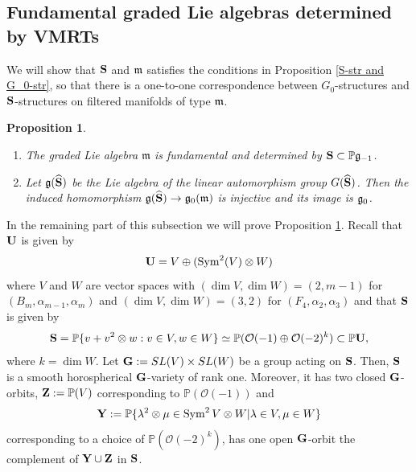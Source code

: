 \documentclass[12pt]{amsart}
\theoremstyle{plain}
\newtheorem{proposition}[theorem]{Proposition}
\theoremstyle{definition}
\def\Sym{\operatorname{Sym}}
\begin{document}
\subsection{Fundamental graded Lie algebras determined by VMRTs}    \label{sect: geometric structures modeled after X}

We will show that ${\bf S}$ and $\frak m$ satisfies the conditions in
Proposition \ref{S-str and G_0-str}, so that there is a one-to-one correspondence between $G_0$-structures and ${\bf S}$-structures on filtered manifolds of type $\frak m$.

\begin{proposition} \label{fundamental graded Lie algebra of vmrt}  $\,$
 \begin{enumerate}
\item The graded Lie algebra  $\mathfrak m $ is fundamental and determined by ${\bf S}  \subset \mathbb P \mathfrak g_{-1}$.
\item Let $\frak g(\widehat{\bf S})$ be the Lie algebra of the linear automorphism group   $G(\widehat{\bf S})$.
Then the induced homomorphism $\frak g(\widehat{\bf S}) \rightarrow \frak g_0(\frak m)$ is injective and its image is $\frak g_0$.
\end{enumerate}
 \end{proposition}

In the remaining part of this subsection we will prove Proposition \ref{fundamental graded Lie algebra of vmrt}. %
Recall that ${\bf U}$ is given by  $${\bf U} = V \oplus (\Sym^2(V) \otimes W)$$ where $V$ and $W$ are vector spaces with $(\dim V, \dim W)=(2, m-1)$ for $(B_m, \alpha_{m-1}, \alpha_{m})$ and $(\dim V, \dim W)=(3, 2)$ for $(F_4, \alpha_2, \alpha_3)$ and  that    ${{\bf S}}$ is given by
$${\bf S}=\mathbb P \{ v + v^2 \otimes w: v \in V, w \in W\}  \simeq \mathbb P (\mathcal O(-1) \oplus \mathcal O(-2)^{k}) \subset \mathbb P\bf U,$$ where $k=\dim W$.
Let ${\bf G}:=SL(V) \times SL(W)$ be a group acting on $\bf S$. Then, ${\bf S}$ is a smooth horospherical ${\bf G}$-variety of rank one. Moreover,  it has two closed ${\bf G}$-orbits, ${\bf Z}  :=\mathbb P(V)$ corresponding to $\mathbb P(\mathcal O(-1))$ and
\begin{eqnarray*}  {\bf Y}   := \mathbb P \{\lambda^2\otimes\mu \in \Sym^2V\otimes W | \lambda \in V ,
\mu \in W \}\end{eqnarray*}
corresponding to a choice of  $\mathbb P(\mathcal O(-2)^{k})$, has one open ${\bf G}$-orbit the complement of ${\bf Y} \cup {\bf Z}$ in ${\bf S}$.
\end{document}
